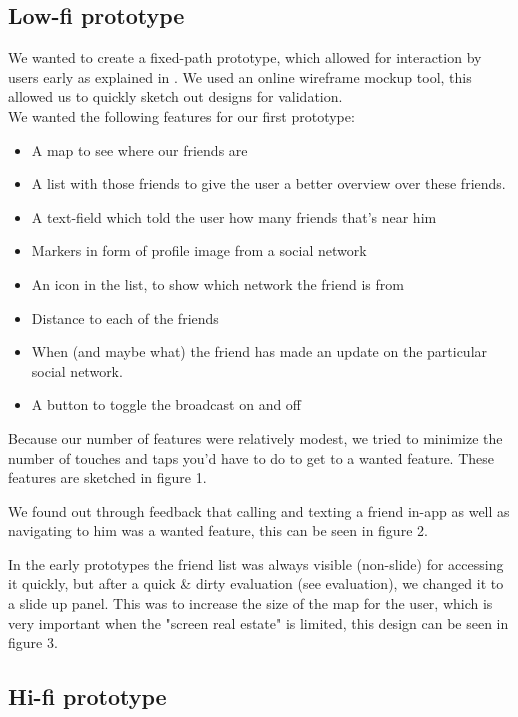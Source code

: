 \documentclass[runningheads,a4paper]{llncs}
\begin{document}
\subsection{Low-fi prototype}
We wanted to create a fixed-path prototype, which allowed for interaction by users early as explained in \cite{prototyping}. We used an online wireframe mockup tool\cite{ninja}, this allowed us to quickly sketch out designs for validation. \\


We wanted the following features for our first prototype: 
\begin{itemize}
  \item A map to see where our friends are 
	\item A list with those friends to give the user a better overview over these friends. 
	\item A text-field which told the user how many friends that’s near him
	\item Markers in form of profile image from a social network
	\item An icon in the list, to show which network the friend is from
	\item Distance to each of the friends
	\item When (and maybe what) the friend has made an update on the particular social network.
	\item A button to toggle the broadcast on and off\\ 
\end{itemize}

Because our number of features were relatively modest, we tried to minimize the number of touches and taps you'd have to do to get to a wanted feature. These features are sketched in figure 1.

We found out through feedback that calling and texting a friend in-app as well as navigating to him was a wanted feature, this can be seen in figure 2. 

In the early prototypes the friend list was always visible (non-slide) for accessing it quickly, but after a quick \& dirty evaluation (see evaluation), we changed it to a slide up panel. This was to increase the size of the map for the user, which is very important when the "screen real estate" is limited, this design can be seen in figure 3.

\subsection{Hi-fi prototype}
\end{document}
